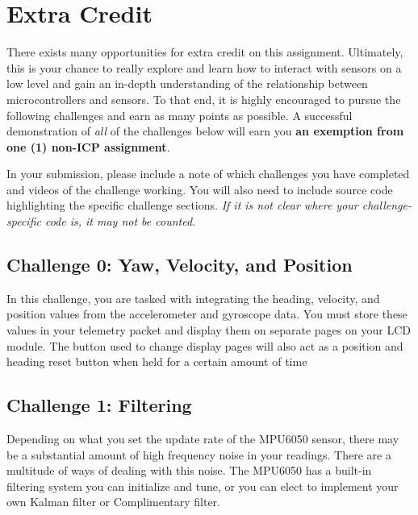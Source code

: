 \section*{Extra Credit} 
There exists many opportunities for extra credit on this assignment. 
Ultimately, this is your chance to really explore and learn how to interact with sensors on a low level and gain an in-depth understanding of the relationship between microcontrollers and sensors.
To that end, it is highly encouraged to pursue the following challenges and earn as many points as possible.
A successful demonstration of \emph{all} of the challenges below will earn you \textbf{an exemption from one (1) non-ICP assignment}.

In your submission, please include a note of which challenges you have completed and videos of the challenge working. 
You will also need to include source code highlighting the specific challenge sections.
\emph{If it is not clear where your challenge-specific code is, it may not be counted.}

    \subsection*{Challenge 0: Yaw, Velocity, and Position}
    In this challenge, you are tasked with integrating the heading, velocity, and position values from the accelerometer and gyroscope data.
    You must store these values in your telemetry packet and display them on separate pages on your LCD module.
    The button used to change display pages will also act as a position and heading reset button when held for a certain amount of time 

    \subsection*{Challenge 1: Filtering}
    Depending on what you set the update rate of the MPU6050 sensor, there may be a substantial amount of high frequency noise in your readings.
    There are a multitude of ways of dealing with this noise.
    The MPU6050 has a built-in filtering system you can initialize and tune, or you can elect to implement your own Kalman filter or Complimentary filter. 

